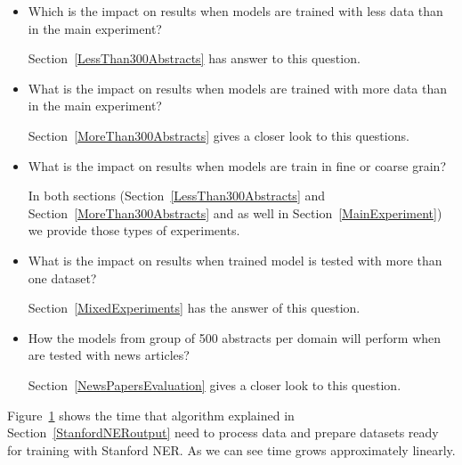 \documentclass[thesis=M,english]{FITthesis}[2018/05/30]
\begin{document}
\begin{itemize}
	\item Which is the impact on results when models are trained with less data than in the main experiment?
	
	Section~\ref{LessThan300Abstracts} has answer to this question.
	
	\item What is the impact on results when models are trained with more data than in the main experiment? 
	
	Section~\ref{MoreThan300Abstracts} gives a closer look to this questions.
	
	\item What is the impact on results when models are train in fine or coarse grain? 
	
	In both sections (Section~\ref{LessThan300Abstracts} and Section~\ref{MoreThan300Abstracts} and as well in Section~\ref{MainExperiment}) we provide those types of experiments.
	
	\item What is the impact on results when trained model is tested with more than one dataset? 
	
	Section~\ref{MixedExperiments} has the answer of this question.
	
	\item How the models from group of 500 abstracts per domain will perform when are tested with news articles?
	
	Section~\ref{NewsPapersEvaluation} gives a closer look to this question.

\end{itemize}

Figure~\ref{TimeGraph} shows the time that algorithm explained in Section~\ref{StanfordNERoutput} need to process data and prepare datasets ready for training with Stanford NER. As we can see time grows approximately linearly.

\begin{figure}\centering

\caption{\label{TimeGraph}}
\end{figure}
\end{document}
